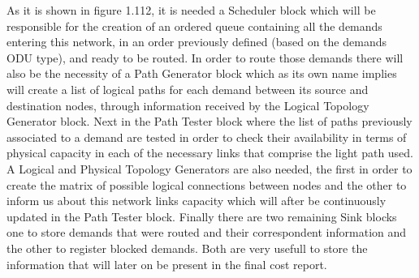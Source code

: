 As it is shown in figure 1.112, it is needed a Scheduler block which will be responsible for the creation of an ordered queue containing all the demands entering this network, in an order previously defined (based on the demands ODU type), and ready to be routed.
In order to route those demands there will also be the necessity of a Path Generator block which as its own name implies will create a list of logical paths for each demand between its source and destination nodes, through information received by the Logical Topology Generator block. Next in the Path Tester block where the list of paths previously associated to a demand are tested in order to check their availability in terms of physical capacity in each of the necessary links that comprise the light path used. A Logical and Physical Topology Generators are also needed, the first in order to create the matrix of possible logical connections between nodes and the other to inform us about this network links capacity which will after be continuously updated in the Path Tester block. Finally there are two remaining Sink blocks one to store demands that were routed and their correspondent information and the other to register blocked demands. Both are very usefull to store the information that will later on be present in the final cost report.




